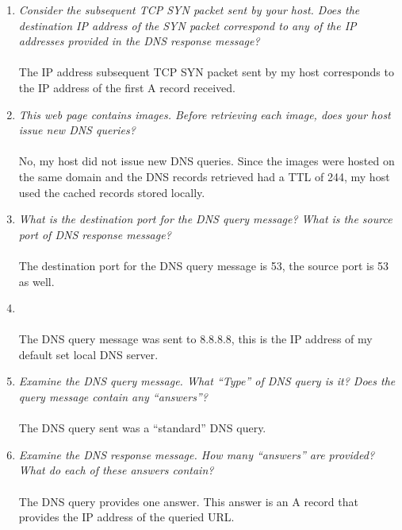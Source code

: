 \documentclass[12pt]{article}
\begin{document}
\begin{enumerate}
	\item{\textit{Consider the subsequent TCP SYN packet sent by your host. Does the destination IP address of the SYN packet correspond to any of the IP addresses provided in the DNS response message?}}\\ \\
		The IP address subsequent TCP SYN packet sent by my host corresponds to the IP address of the first A record received.

	\item{\textit{This web page contains images. Before retrieving each image, does your host issue new DNS queries?}}\\ \\
		No, my host did not issue new DNS queries. Since the images were hosted on the same domain and the DNS records retrieved had a TTL of 244, my host used the cached records stored locally.
		
	\item{\textit{What is the destination port for the DNS query message? What is the source port of DNS response message?}} \\ \\
		The destination port for the DNS query message is 53, the source port is 53 as well.

	\item{ }\\ \\
		The DNS query message was sent to 8.8.8.8, this is the IP address of my default set local DNS server.

	\item{\textit{Examine the DNS query message. What “Type” of DNS query is it? Does the query message contain any “answers”?}}\\ \\ 
		The DNS query sent was a ``standard'' DNS query.

	\item{\textit{Examine the DNS response message. How many “answers” are provided? What do each of these answers contain?}}\\ \\
		The DNS query provides one answer. This answer is an A record that provides the IP address of the queried URL.


\end{enumerate}
\end{document}

